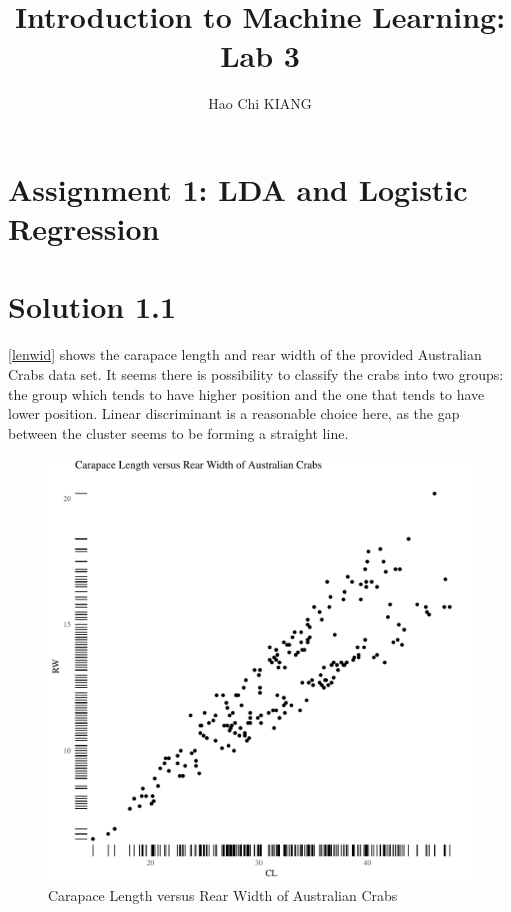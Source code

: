 \documentclass[11pt,english]{article}
\begin{document}
\author{Hao Chi KIANG}
\title{Introduction to Machine Learning: Lab 3}
\maketitle

\section*{Assignment 1: LDA and Logistic Regression}
\section*{Solution 1.1}
\autoref{lenwid} shows the carapace length and rear width of
the provided Australian Crabs data set. It seems there is
possibility to classify the crabs into two groups: the group
which tends to have higher position and the one that tends to
have lower position. Linear discriminant is a reasonable choice
here, as the gap between the cluster seems to be forming a
straight line.

\begin{figure}[H]
  \centering
  \includegraphics[width = 1.13\textwidth]{lenwid.pdf}
  \caption{Carapace Length versus Rear Width of Australian Crabs}
  \label{lenwid}
\end{figure}
\end{document}
